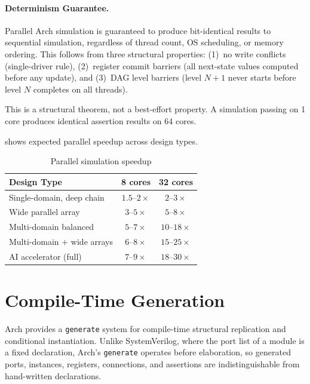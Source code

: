 \documentclass[11pt,twocolumn]{article}
\begin{document}
\paragraph{Determinism Guarantee.}
Parallel Arch simulation is guaranteed to produce bit-identical results to sequential simulation, regardless of thread count, OS scheduling, or memory ordering. This follows from three structural properties:
(1)~no write conflicts (single-driver rule),
(2)~register commit barriers (all next-state values computed before any update), and
(3)~DAG level barriers (level $N{+}1$ never starts before level $N$ completes on all threads).

This is a structural theorem, not a best-effort property. A simulation passing on 1 core produces identical assertion results on 64 cores.

 shows expected parallel speedup across design types.

\begin{table}[H]
\centering
\caption{Parallel simulation speedup}
\label{tab:scaling}
\small
\begin{tabular}{@{}lcc@{}}
\toprule
\textbf{Design Type} & \textbf{8 cores} & \textbf{32 cores} \\
\midrule
Single-domain, deep chain & $1.5$--$2\times$ & $2$--$3\times$ \\
Wide parallel array & $3$--$5\times$ & $5$--$8\times$ \\
Multi-domain balanced & $5$--$7\times$ & $10$--$18\times$ \\
Multi-domain + wide arrays & $6$--$8\times$ & $15$--$25\times$ \\
AI accelerator (full) & $7$--$9\times$ & $18$--$30\times$ \\
\bottomrule
\end{tabular}
\end{table}

\section{Compile-Time Generation}\label{sec:generate}

Arch provides a \texttt{generate} system for compile-time structural replication and conditional instantiation. Unlike SystemVerilog, where the port list of a module is a fixed declaration, Arch's \texttt{generate} operates before elaboration, so generated ports, instances, registers, connections, and assertions are indistinguishable from hand-written declarations.
\end{document}

